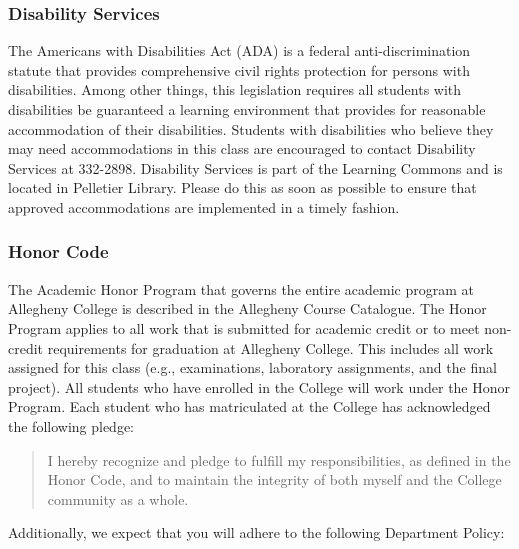 \documentclass[11pt]{article} %
\begin{document}
\subsubsection*{\textbf{Disability Services}}

The Americans with Disabilities Act (ADA) is a federal anti-discrimination statute that provides comprehensive civil
rights protection for persons with disabilities.  Among other things, this legislation requires all students with
disabilities be guaranteed a learning environment that provides for reasonable accommodation of their disabilities.
Students with disabilities who believe they may need accommodations in this class are encouraged to contact Disability
Services at 332-2898.  Disability Services is part of the Learning Commons and is located in Pelletier Library.
Please do this as soon as possible to ensure that approved accommodations are implemented in a timely fashion.

\subsubsection*{\textbf{Honor Code}}

The Academic Honor Program that governs the entire academic program at Allegheny College is described in the Allegheny
Course Catalogue.  The Honor Program applies to all work that is submitted for academic credit or to meet non-credit
requirements for graduation at Allegheny College.  This includes all work assigned for this class (e.g., examinations,
  laboratory assignments, and the final project).  All students who have enrolled in the College will work under the Honor
Program.  Each student who has matriculated at the College has acknowledged the following pledge:

\vspace*{-.1in}
\begin{quote}
  I hereby recognize and pledge to fulfill my responsibilities, as defined in the Honor Code, and to maintain the
  integrity of both myself and the College community as a whole.
\end{quote}
\vspace*{-.1in}

\noindent Additionally, we expect that you will adhere to the 
following Department Policy:
\end{document}
